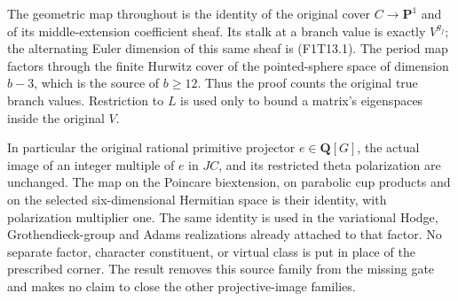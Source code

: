 The geometric map throughout is the identity of the original
cover \(C\to\mathbf P^1\) and of its middle-extension
coefficient sheaf. Its stalk at a branch value is exactly
\(V^{g_j}\); the alternating Euler dimension of this
same sheaf is (F1T13.1). The period map factors through
the finite Hurwitz cover of the pointed-sphere space of
dimension \(b-3\), which is the source of \(b\ge12\).
Thus the proof counts the original true branch values.
Restriction to \(L\) is used only to bound a matrix's
eigenspaces inside the original \(V\).

In particular the original rational primitive projector
\(e\in\mathbf Q[G]\), the actual image of an integer
multiple of \(e\) in \(JC\), and its restricted theta
polarization are unchanged. The map on the Poincare
biextension, on parabolic cup products and on the selected
six-dimensional Hermitian space is their identity, with
polarization multiplier one. The same identity is used
in the variational Hodge, Grothendieck-group and Adams
realizations already attached to that factor. No separate
factor, character constituent, or virtual class is put in
place of the prescribed corner. The result removes this
source family from the missing gate and makes no claim
to close the other projective-image families.
